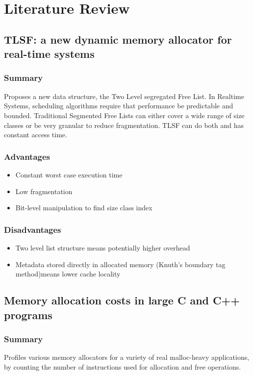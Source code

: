 \documentclass{report}
\begin{document}
\chapter{Literature Review}

\section[TLSF]{TLSF: a new dynamic memory allocator for real-time systems \cite{inproceedings}}

\subsection{Summary}
Proposes a new data structure, the Two Level segregated Free List. In Realtime Systems, scheduling algorithms require that performance be predictable and bounded. Traditional Segmented Free Lists can either cover a wide range of size classes or be very granular to reduce fragmentation. TLSF can do both and has constant access time.

\subsection{Advantages}
\begin{itemize}
	\item{Constant worst case execution time}
	\item{Low fragmentation}
	\item{Bit-level manipulation to find size class index}
\end{itemize}

\subsection{Disadvantages}
\begin{itemize}
	\item{Two level list structure means potentially higher overhead}
	\item{Metadata stored directly in allocated memory (Knuth's boundary tag method)means lower cache locality}
\end{itemize}

\section[Allocation Costs]{Memory allocation costs in large C and C++ programs \cite{10.1002/spe.4380240602}}
\subsection{Summary}
Profiles various memory allocators for a variety of real malloc-heavy applications, by counting the number of instructions used for allocation and free operations.
\end{document}
